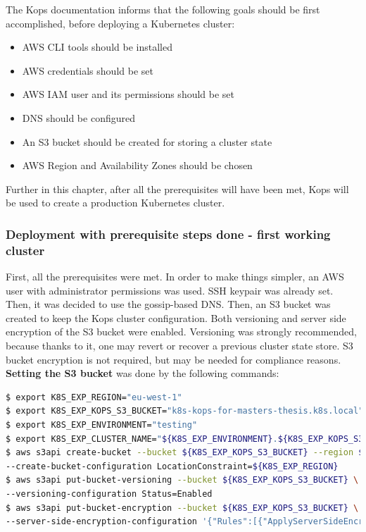 The Kops documentation\cite{online-kops-aws} informs that the following goals should be first accomplished, before deploying a Kubernetes cluster:
\begin{itemize}
\item AWS CLI tools should be installed
\item AWS credentials should be set
\item AWS IAM user and its permissions should be set
\item DNS should be configured
\item An S3 bucket should be created for storing a cluster state
\item AWS Region and Availability Zones should be chosen
\end{itemize}

Further in this chapter, after all the prerequisites will have been met, Kops will be used to create a production Kubernetes cluster.

\subsubsection{Deployment with prerequisite steps done - first working cluster}

First, all the prerequisites were met. In order to make things simpler, an AWS user with administrator permissions was used. SSH keypair was already set. Then, it was decided to use the gossip-based DNS. Then, an S3 bucket was created to keep the Kops cluster configuration. Both versioning and server side encryption of the S3 bucket were enabled. Versioning was strongly recommended, because thanks to it, one may revert or recover a previous cluster state store. S3 bucket encryption is not required, but may be needed for compliance reasons\cite{online-kops-aws}. \textbf{Setting the S3 bucket} was done by the following commands:
\begin{lstlisting}[basicstyle=\tiny,caption={Commands used to set an AWS S3 bucket for Kops},captionpos=b,language=Bash,xleftmargin=1cm]
$ export K8S_EXP_REGION="eu-west-1"
$ export K8S_EXP_KOPS_S3_BUCKET="k8s-kops-for-masters-thesis.k8s.local"
$ export K8S_EXP_ENVIRONMENT="testing"
$ export K8S_EXP_CLUSTER_NAME="${K8S_EXP_ENVIRONMENT}.${K8S_EXP_KOPS_S3_BUCKET}"
$ aws s3api create-bucket --bucket ${K8S_EXP_KOPS_S3_BUCKET} --region ${K8S_EXP_REGION} \
--create-bucket-configuration LocationConstraint=${K8S_EXP_REGION}
$ aws s3api put-bucket-versioning --bucket ${K8S_EXP_KOPS_S3_BUCKET} \
--versioning-configuration Status=Enabled
$ aws s3api put-bucket-encryption --bucket ${K8S_EXP_KOPS_S3_BUCKET} \
--server-side-encryption-configuration '{"Rules":[{"ApplyServerSideEncryptionByDefault":{"SSEAlgorithm":"AES256"}}]}'
\end{lstlisting}

